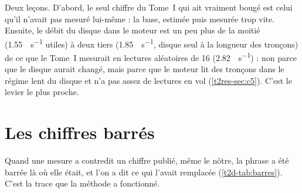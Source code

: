Deux leçons. D'abord, le seul chiffre du Tome~I qui ait vraiment bougé est celui qu'il n'avait pas mesuré lui-même : la base, estimée puis mesurée trop vite. Ensuite, le débit du disque dans le moteur est  un peu plus de la moitié (\SI{1.55}{\Go\per\second} utiles) à deux tiers (\SI{1.85}{\Go\per\second}, disque seul à la longueur des tronçons) de ce que le Tome~I mesurait en lectures aléatoires de \SI{16}{\Mio} (\SI{2.82}{\Go\per\second}) \calc : non parce que le disque aurait changé, mais parce que le moteur lit des tronçons dans le régime lent du disque et n'a pas assez de lectures en vol (\cref{t2res-sec:c5}). C'est le levier le plus proche.

\section{Les chiffres barrés}\label{t2d-sec:barres}

Quand une mesure a contredit un chiffre publié, même le nôtre, la phrase a été barrée là où elle était, et l'on a dit ce qui l'avait remplacée (\cref{t2d-tab:barres}). C'est la trace que la méthode a fonctionné.

